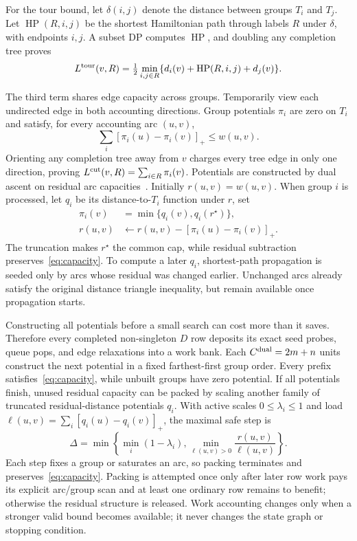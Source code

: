 \documentclass[sigconf,nonacm]{acmart}
\begin{document}
For the tour bound, let $\delta(i,j)$ denote the distance between groups $T_i$ and $T_j$.  Let $\operatorname{HP}(R,i,j)$ be the shortest Hamiltonian path through labels $R$ under $\delta$, with endpoints $i,j$.  A subset DP computes $\operatorname{HP}$, and doubling any completion tree proves
\[
 L^{\rm tour}(v,R)=\tfrac12\min_{i,j\in R}
 \{d_i(v)+\operatorname{HP}(R,i,j)+d_j(v)\}.
\]

The third term shares edge capacity across groups.  Temporarily view each undirected edge in both accounting directions.  Group potentials $\pi_i$ are zero on $T_i$ and satisfy, for every accounting arc $(u,v)$,
\begin{equation}
 \sum_i[\pi_i(u)-\pi_i(v)]_+\leq w(u,v).
 \label{eq:capacity}
\end{equation}
Orienting any completion tree away from $v$ charges every tree edge in only one direction, proving $L^{\rm cut}(v,R)=\sum_{i\in R}\pi_i(v)$.  Potentials are constructed by dual ascent on residual arc capacities~\cite{wong1984}.  Initially $r(u,v)=w(u,v)$.  When group $i$ is processed, let $q_i$ be its distance-to-$T_i$ function under $r$, set
\[
 \begin{aligned}
 \pi_i(v)&=\min\{q_i(v),q_i(r^\star)\},\\
 r(u,v)&\leftarrow r(u,v)-[\pi_i(u)-\pi_i(v)]_+.
 \end{aligned}
\]
The truncation makes $r^\star$ the common cap, while residual subtraction preserves~\eqref{eq:capacity}.  To compute a later $q_i$, shortest-path propagation is seeded only by arcs whose residual was changed earlier.  Unchanged arcs already satisfy the original distance triangle inequality, but remain available once propagation starts.

Constructing all potentials before a small search can cost more than it saves.  Therefore every completed non-singleton $D$ row deposits its exact seed probes, queue pops, and edge relaxations into a work bank.  Each $C^{\rm dual}=2m+n$ units construct the next potential in a fixed farthest-first group order.  Every prefix satisfies~\eqref{eq:capacity}, while unbuilt groups have zero potential.  If all potentials finish, unused residual capacity can be packed by scaling another family of truncated residual-distance potentials $q_i$.  With active scales $0\leq\lambda_i\leq1$ and load $\ell(u,v)=\sum_i[q_i(u)-q_i(v)]_+$, the maximal safe step is
\[
 \Delta=\min\left\{\min_i(1-\lambda_i),
 \min_{\ell(u,v)>0}\frac{r(u,v)}{\ell(u,v)}\right\}.
\]
Each step fixes a group or saturates an arc, so packing terminates and preserves~\eqref{eq:capacity}.  Packing is attempted once only after later row work pays its explicit arc/group scan and at least one ordinary row remains to benefit; otherwise the residual structure is released.  Work accounting changes only when a stronger valid bound becomes available; it never changes the state graph or stopping condition.
\end{document}
